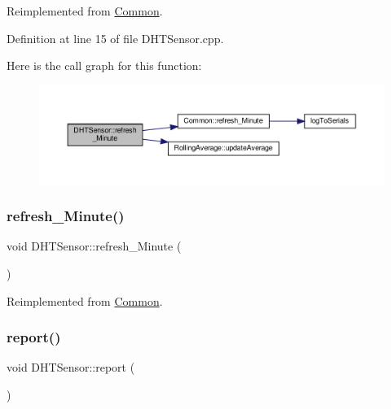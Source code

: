 Reimplemented from \hyperlink{class_common_a14e4462a94bd118028ce1d487ca0292c}{Common}.



Definition at line 15 of file D\+H\+T\+Sensor.\+cpp.

Here is the call graph for this function\+:
\nopagebreak
\begin{figure}[H]
\begin{center}
\leavevmode
\includegraphics[width=350pt]{class_d_h_t_sensor_a7e939e9b6e2e2910a67b98d820e9e552_cgraph}
\end{center}
\end{figure}
\mbox{\label{class_d_h_t_sensor_a7e939e9b6e2e2910a67b98d820e9e552}} 
\subsubsection{\texorpdfstring{refresh\+\_\+\+Minute()}{refresh\_Minute()}\hspace{0.1cm}{\footnotesize\ttfamily [2/2]}}
{\footnotesize\ttfamily void D\+H\+T\+Sensor\+::refresh\+\_\+\+Minute (\begin{DoxyParamCaption}{ }\end{DoxyParamCaption})\hspace{0.3cm}{\ttfamily [virtual]}}



Reimplemented from \hyperlink{class_common_a14e4462a94bd118028ce1d487ca0292c}{Common}.

\mbox{\label{class_d_h_t_sensor_a2ef11882c3401c097b7a08e4b35eb103}} 
\subsubsection{\texorpdfstring{report()}{report()}\hspace{0.1cm}{\footnotesize\ttfamily [1/2]}}
{\footnotesize\ttfamily void D\+H\+T\+Sensor\+::report (\begin{DoxyParamCaption}{ }\end{DoxyParamCaption})\hspace{0.3cm}{\ttfamily [virtual]}}



